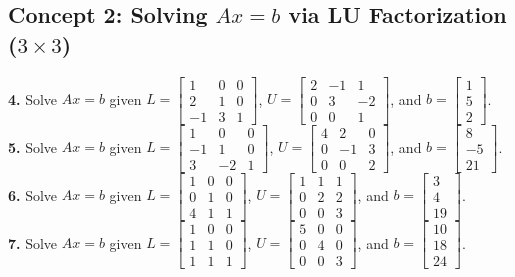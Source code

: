 \documentclass[11pt]{article}
\begin{document}
\subsection*{Concept 2: Solving $Ax = b$ via LU Factorization ($3 \times 3$)}
\textbf{4.} Solve $Ax = b$ given $L = \begin{bmatrix} 1 & 0 & 0 \\ 2 & 1 & 0 \\ -1 & 3 & 1 \end{bmatrix}$, $U = \begin{bmatrix} 2 & -1 & 1 \\ 0 & 3 & -2 \\ 0 & 0 & 1 \end{bmatrix}$, and $b = \begin{bmatrix} 1 \\ 5 \\ 2 \end{bmatrix}$. \\
\textbf{5.} Solve $Ax = b$ given $L = \begin{bmatrix} 1 & 0 & 0 \\ -1 & 1 & 0 \\ 3 & -2 & 1 \end{bmatrix}$, $U = \begin{bmatrix} 4 & 2 & 0 \\ 0 & -1 & 3 \\ 0 & 0 & 2 \end{bmatrix}$, and $b = \begin{bmatrix} 8 \\ -5 \\ 21 \end{bmatrix}$. \\
\textbf{6.} Solve $Ax = b$ given $L = \begin{bmatrix} 1 & 0 & 0 \\ 0 & 1 & 0 \\ 4 & 1 & 1 \end{bmatrix}$, $U = \begin{bmatrix} 1 & 1 & 1 \\ 0 & 2 & 2 \\ 0 & 0 & 3 \end{bmatrix}$, and $b = \begin{bmatrix} 3 \\ 4 \\ 19 \end{bmatrix}$. \\
\textbf{7.} Solve $Ax = b$ given $L = \begin{bmatrix} 1 & 0 & 0 \\ 1 & 1 & 0 \\ 1 & 1 & 1 \end{bmatrix}$, $U = \begin{bmatrix} 5 & 0 & 0 \\ 0 & 4 & 0 \\ 0 & 0 & 3 \end{bmatrix}$, and $b = \begin{bmatrix} 10 \\ 18 \\ 24 \end{bmatrix}$.
\end{document}
